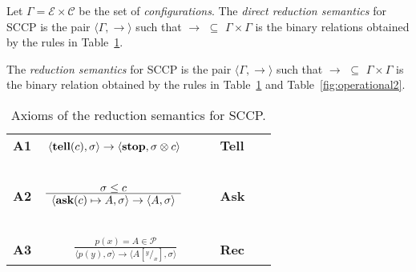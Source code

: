 \documentclass{llncs}
\def\C{{\mathcal C}}
\newcommand{\tell}{{\bf tell}}
\newcommand{\ask}{{\bf ask}}
\newcommand{\ostop}{{\bf stop}}
\def\C{{\mathcal C}}
\def\odiv{\, {\ominus\hspace{-7.7pt} \div} \,}
\begin{document}
\begin{definition}[Reductions]\label{def:reductions}
Let $\Gamma = {\mathcal E} \times \C$ be the set of \emph{configurations}.
The \emph{direct reduction semantics} for SCCP is the pair 
$\langle \Gamma,  \to \rangle$
such that $\to \, \, \subseteq \, \,\Gamma \times   \Gamma$ is the 
binary relations obtained by the rules in 
Table~\ref{fig:operational}.

The \emph{reduction semantics} for SCCP is the pair 
$\langle \Gamma,  \rightarrow \rangle$
such that $\rightarrow \, \, \subseteq \, \,\Gamma \times   \Gamma$ is the
binary relation obtained by the rules in 
Table~\ref{fig:operational} and Table~\ref{fig:operational2}.
\end{definition}

\def\odiv{\; {\ominus\hspace{-6pt} \div} \;}
\def\odivvv{\; {\ominus\hspace{-6pt} \div} \;}

\begin{table}  %
   \begin{center}
   \begin{tabular}{lcll} 
   \mbox{\bf A1}& $ {\displaystyle \langle \hbox{\tell}(c), \sigma \rangle \to \langle 
   \hbox{\ostop}, \sigma \otimes c\rangle}$
   \ \ \ & \bf{Tell}&
  \\ 
  &\mbox{   }&\mbox{   } &\mbox{   }
  \\
  \mbox{\bf A2}& $\frac {\displaystyle \sigma \leq c}{\displaystyle
  	\begin{array}{l} \langle \hbox{\ask}(c) \mapsto A, \sigma \rangle \to \langle A, \sigma \rangle   	\end{array}}$
    \ \ \ & \bf{Ask}&
    \\
    &\mbox{   }&\mbox{   }&
    \\
  \mbox{\bf A3}& $\frac {\displaystyle p(x) = A \in \mathcal{P} }
  {\displaystyle\langle p(y),\sigma\rangle \to \langle A[^y/_x], \sigma \rangle}$ 
  &\bf{Rec}&
  \end{tabular}
  \end{center}
\caption{Axioms of the reduction semantics for SCCP.}
\label{fig:operational}
\end{table}
\end{document}
